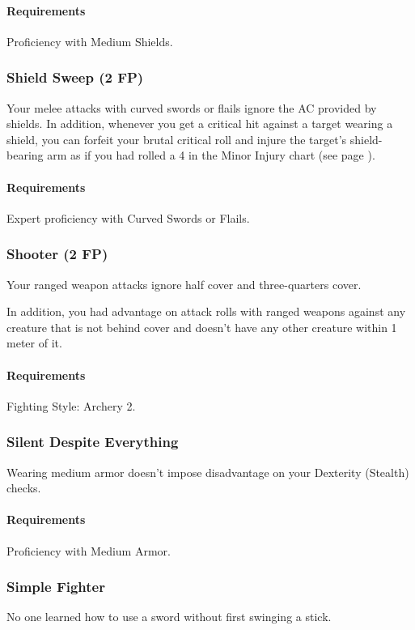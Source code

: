     \paragraph{Requirements} Proficiency with Medium Shields.
\subsubsection{Shield Sweep (2 FP)} \label{feat::shieldsweep}
    Your melee attacks with curved swords or flails ignore the AC provided by shields.
    In addition, whenever you get a critical hit against a target wearing a shield, you can forfeit your brutal critical roll and injure the target's shield-bearing arm as if you had rolled a 4 in the Minor Injury chart (see page \pageref{ssec::injuriesandinsanity}).
    \paragraph{Requirements} Expert proficiency with Curved Swords or Flails.
\subsubsection{Shooter (2 FP)} \label{feat::shooter}
    Your ranged weapon attacks ignore half cover and three-quarters cover.

    In addition, you had advantage on attack rolls with ranged weapons against any creature that is not behind cover and doesn't have any other creature within 1 meter of it.
    \paragraph{Requirements} Fighting Style: Archery 2.
\subsubsection{Silent Despite Everything} \label{feat::silentdespiteeverything}
    Wearing medium armor doesn't impose disadvantage on your Dexterity (Stealth) checks.
    \paragraph{Requirements} Proficiency with Medium Armor.
\subsubsection{Simple Fighter} \label{feat::simplefighter}
    No one learned how to use a sword without first swinging a stick.

